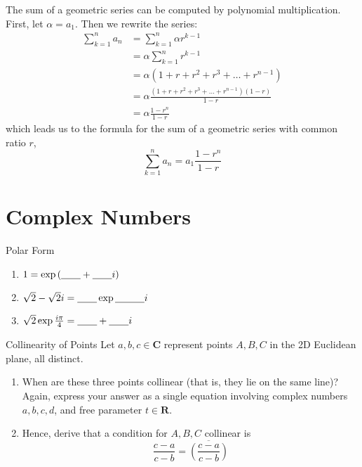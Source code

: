 \documentclass[12pt,a4paper]{report}
\newcommand{\im}{i}
\begin{document}
The sum of a geometric series can be computed by polynomial multiplication.
First, let $\alpha = a_1$. Then we rewrite the series: \begin{align*}
 \sum_{k=1}^n a_n
 &= \sum_{k=1}^n \alpha r^{k-1} \\
 &= \alpha \sum_{k=1}^n r^{k-1} \\
 &= \alpha (1 + r + r^2 + r^3 + \dots + r^{n-1}) \\
 &= \alpha \frac{(1 + r + r^2 + r^3 + \dots + r^{n-1})(1-r)}{1-r} \\
 &= \alpha \frac{1-r^n}{1-r}
\end{align*} which leads us to the formula for the sum of a geometric series
with common ratio $r$,
\begin{equation}
 \sum_{k=1}^n a_n = a_1 \frac{1 - r^n}{1 - r}
\end{equation}

\chapter{Complex Numbers}

\begin{problem}{Polar Form}
  \begin{enumerate}[\hspace{.5cm}a.]
    \item \(1 = \exp\left(\blankB + \blankB\im\right)\)
    \item \(\sqrt{2}-\sqrt{2}\im = \blankB\exp\blankC\im\)
    \item \(\sqrt{2}\exp\frac{\im\pi}{4} = \blankB + \blankB\im\)
  \end{enumerate}
\end{problem}

\begin{problem}{Collinearity of Points}
  Let \(a, b, c\in\mathbf{C}\) represent points \(A, B, C\) in the 2D Euclidean
  plane, all distinct.

  \begin{enumerate}[\hspace{.5cm}a.]
    \item When are these three points collinear (that is, they lie on the same
    line)? Again, express your answer as a single equation involving complex
    numbers \(a, b, c, d\), and free parameter \(t\in\mathbf{R}\).
    \item Hence, derive that a condition for \(A, B, C\) collinear is \[
      \frac{c-a}{c-b} = \overline{\left(\frac{c-a}{c-b}\right)}
    \]
  \end{enumerate}
\end{problem}
\end{document}
